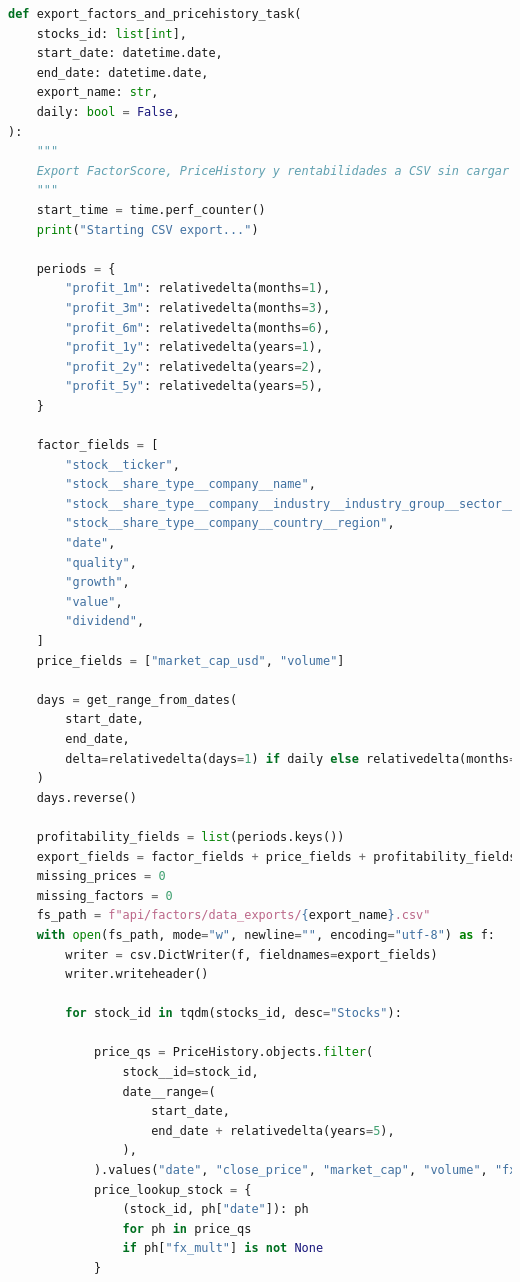 \documentclass[11pt,english,a4paper,hidelinks]{book}
\begin{document}
\begin{lstlisting}[language=Python, caption=Data Export Job Implementation]
def export_factors_and_pricehistory_task(
    stocks_id: list[int],
    start_date: datetime.date,
    end_date: datetime.date,
    export_name: str,
    daily: bool = False,
):
    """
    Export FactorScore, PriceHistory y rentabilidades a CSV sin cargar todo en memoria.
    """
    start_time = time.perf_counter()
    print("Starting CSV export...")

    periods = {
        "profit_1m": relativedelta(months=1),
        "profit_3m": relativedelta(months=3),
        "profit_6m": relativedelta(months=6),
        "profit_1y": relativedelta(years=1),
        "profit_2y": relativedelta(years=2),
        "profit_5y": relativedelta(years=5),
    }

    factor_fields = [
        "stock__ticker",
        "stock__share_type__company__name",
        "stock__share_type__company__industry__industry_group__sector__name",
        "stock__share_type__company__country__region",
        "date",
        "quality",
        "growth",
        "value",
        "dividend",
    ]
    price_fields = ["market_cap_usd", "volume"]

    days = get_range_from_dates(
        start_date,
        end_date,
        delta=relativedelta(days=1) if daily else relativedelta(months=1),
    )
    days.reverse()

    profitability_fields = list(periods.keys())
    export_fields = factor_fields + price_fields + profitability_fields
    missing_prices = 0
    missing_factors = 0
    fs_path = f"api/factors/data_exports/{export_name}.csv"
    with open(fs_path, mode="w", newline="", encoding="utf-8") as f:
        writer = csv.DictWriter(f, fieldnames=export_fields)
        writer.writeheader()

        for stock_id in tqdm(stocks_id, desc="Stocks"):

            price_qs = PriceHistory.objects.filter(
                stock__id=stock_id,
                date__range=(
                    start_date,
                    end_date + relativedelta(years=5),
                ),
            ).values("date", "close_price", "market_cap", "volume", "fx_mult")
            price_lookup_stock = {
                (stock_id, ph["date"]): ph
                for ph in price_qs
                if ph["fx_mult"] is not None
            }


\end{lstlisting}
\end{document}
